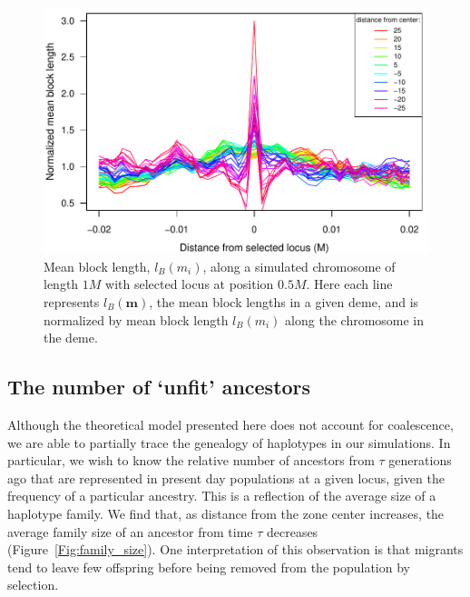 \documentclass[12pt]{article}
\begin{document}
\begin{figure}
\includegraphics{figs/blocksAlongChromAncBConditioning}
\caption{Mean block length, $l_B(m_i)$, along a simulated chromosome of length $1M$ with selected locus at position $0.5M$. Here each line represents  $l_B(\mathbf{m})$, the mean block lengths in a given deme, and is normalized by mean block length $l_B(m_i)$ along the chromosome in the deme.}\label{Fig:blockLengths}
\end{figure}

\subsection*{The number of `unfit' ancestors}
Although the theoretical model presented here does not account for coalescence, we are able to partially trace the genealogy of haplotypes in our simulations. In particular, we wish to know the relative number of ancestors from $\tau$ generations ago that are represented in present day populations at a given locus, given the frequency of a particular ancestry. This is a reflection of the average size of a haplotype family. We find that, as distance from the zone center increases, the average family size of an ancestor from time $\tau$ decreases (Figure~\ref{Fig:family_size}). One interpretation of this observation is that migrants tend to leave few offspring before being removed from the population by selection. 
\end{document}
